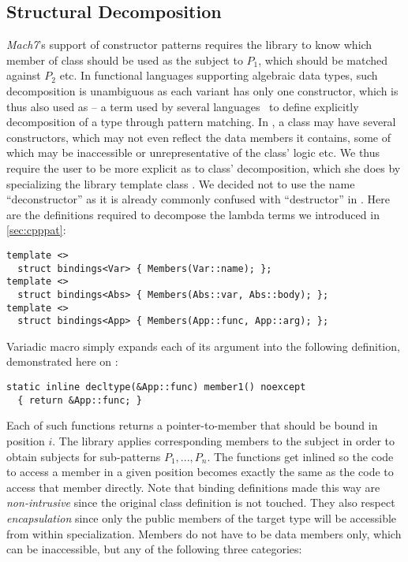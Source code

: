 \subsection{Structural Decomposition}
\label{sec:bnd}

\emph{Mach7}'s support of constructor patterns  requires the 
library to know which member of class  should be used as the subject to 
$P_1$, which should be matched against $P_2$ etc. In functional languages 
supporting algebraic data types, such decomposition is unambiguous as each 
variant has only one constructor, which is thus also used as 
-- a term used by several languages~\cite{padl08,Thorn2012} to define explicitly
decomposition of a type through pattern matching. In \Cpp{}, a class may have 
several constructors, which may not even reflect the data members it contains, 
some of which may be inaccessible or unrepresentative of the class' logic etc. 
We thus require the user to be more explicit as to class' decomposition, which 
she does by specializing the library template class . We decided 
not to use the name ``deconstructor'' as it is already commonly confused with 
``destructor'' in \Cpp{}. Here are the definitions required to decompose the 
lambda terms we introduced in \textsection\ref{sec:cpppat}:

\begin{lstlisting}
template <> 
  struct bindings<Var> { Members(Var::name); };
template <> 
  struct bindings<Abs> { Members(Abs::var, Abs::body); };
template <> 
  struct bindings<App> { Members(App::func, App::arg); };
\end{lstlisting}

\noindent
Variadic macro  simply expands each of its argument into the 
following definition, demonstrated here on :

\begin{lstlisting}
static inline decltype(&App::func) member1() noexcept 
  { return &App::func; }
\end{lstlisting}

\noindent
Each of such functions returns a pointer-to-member that should be bound in 
position $i$. The library applies corresponding members to the subject in order 
to obtain subjects for sub-patterns $P_1,...,P_n$. The functions get inlined so 
the code to access a member in a given position becomes exactly the same as the 
code to access that member directly. Note that binding definitions made this way 
are \emph{non-intrusive} since the original class definition is not touched. 
They also respect \emph{encapsulation} since only the public members of the 
target type will be accessible from within  specialization. 
Members do not have to be data members only, which can be inaccessible, but any 
of the following three categories:

